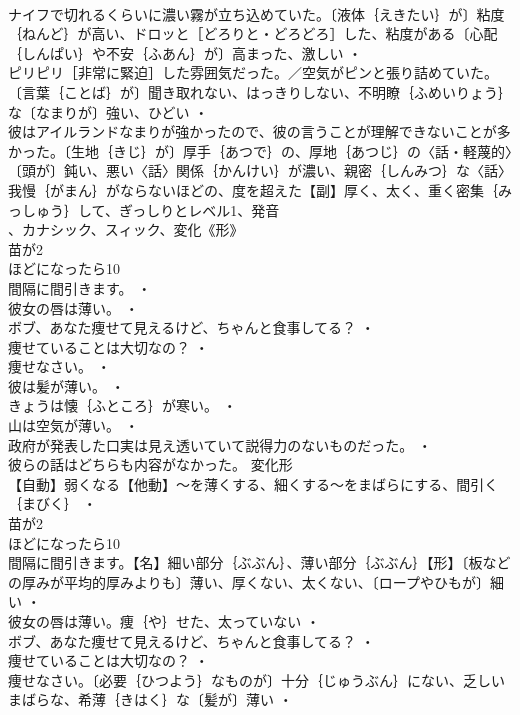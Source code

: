 \documentclass[8pt]{extreport}
\begin{document}
\begin{CJK}{UTF8}{min}
\\	ナイフで切れるくらいに濃い霧が立ち込めていた。〔液体｛えきたい｝が〕粘度｛ねんど｝が高い、ドロッと［どろりと・どろどろ］した、粘度がある〔心配｛しんぱい｝や不安｛ふあん｝が〕高まった、激しい ・
\\	ピリピリ［非常に緊迫］した雰囲気だった。／空気がピンと張り詰めていた。〔言葉｛ことば｝が〕聞き取れない、はっきりしない、不明瞭｛ふめいりょう｝な〔なまりが〕強い、ひどい ・
\\	彼はアイルランドなまりが強かったので、彼の言うことが理解できないことが多かった。〔生地｛きじ｝が〕厚手｛あつで｝の、厚地｛あつじ｝の〈話・軽蔑的〉〔頭が〕鈍い、悪い〈話〉関係｛かんけい｝が濃い、親密｛しんみつ｝な〈話〉我慢｛がまん｝がならないほどの、度を超えた【副】厚く、太く、重く密集｛みっしゅう｝して、ぎっしりとレベル1、発音
\\	、カナシック、スィック、変化《形》
\\	苗が2
\\	ほどになったら10
\\	間隔に間引きます。 ・
\\	彼女の唇は薄い。 ・
\\	ボブ、あなた痩せて見えるけど、ちゃんと食事してる？ ・
\\	痩せていることは大切なの？ ・
\\	痩せなさい。 ・
\\	彼は髪が薄い。 ・
\\	きょうは懐｛ふところ｝が寒い。 ・
\\	山は空気が薄い。 ・
\\	政府が発表した口実は見え透いていて説得力のないものだった。 ・
\\	彼らの話はどちらも内容がなかった。	変化形 
\\	【自動】弱くなる【他動】～を薄くする、細くする～をまばらにする、間引く｛まびく｝ ・
\\	苗が2
\\	ほどになったら10
\\	間隔に間引きます。【名】細い部分｛ぶぶん｝、薄い部分｛ぶぶん｝【形】〔板などの厚みが平均的厚みよりも〕薄い、厚くない、太くない、〔ロープやひもが〕細い ・
\\	彼女の唇は薄い。痩｛や｝せた、太っていない ・
\\	ボブ、あなた痩せて見えるけど、ちゃんと食事してる？ ・
\\	痩せていることは大切なの？ ・
\\	痩せなさい。〔必要｛ひつよう｝なものが〕十分｛じゅうぶん｝にない、乏しいまばらな、希薄｛きはく｝な〔髪が〕薄い ・

\end{CJK}
\end{document}
